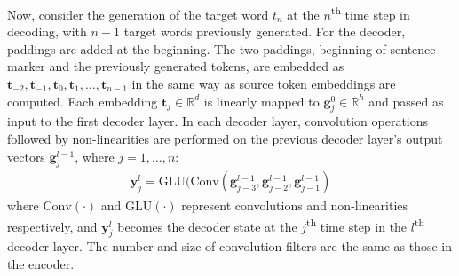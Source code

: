 \documentclass[letterpaper]{article}
\begin{document}
Now, consider the generation of the target word $t_{n}$ at the $n$\textsuperscript{th} time step in decoding, with $n-1$ target words previously generated. For the decoder, paddings are added at the beginning. The two paddings, beginning-of-sentence marker and the previously generated tokens, are embedded as $\mathbf{t}_{-2},\mathbf{t}_{-1}, \mathbf{t}_0,\mathbf{t}_{1},\ldots,\mathbf{t}_{n-1}$ in the same way as source token embeddings are computed. Each embedding $\mathbf{t}_j \in \mathbb{R}^d$ is linearly mapped to $\mathbf{g}^0_{j} \in \mathbb{R}^h$ and passed as input to the first decoder layer. In each decoder layer, convolution operations followed by non-linearities are performed on the previous decoder layer's output vectors $\mathbf{g}^{l-1}_{j}$, where $j = 1,\ldots,n$:
\begin{align*}
\mathbf{y}^l_{j} = \text{GLU}(\text{Conv}(\mathbf{g}^{l-1}_{j-3},\mathbf{g}^{l-1}_{j-2},\mathbf{g}^{l-1}_{j-1})
\end{align*}
where $\text{Conv}(\cdot)$ and $\text{GLU}(\cdot)$ represent convolutions and non-linearities respectively, and $\mathbf{y}^l_j$ becomes the decoder state at the $j$\textsuperscript{th} time step in the $l$\textsuperscript{th} decoder layer. The number and size of convolution filters are the same as those in the encoder.
\end{document}

